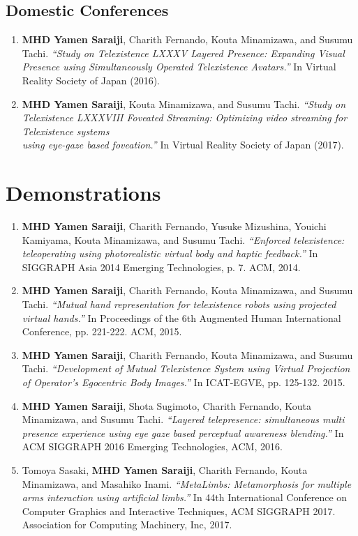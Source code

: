 \subsection{Domestic Conferences}

\begin{enumerate}
\item \textbf{MHD Yamen Saraiji}, Charith Fernando, Kouta Minamizawa, and Susumu Tachi. \textit{``Study on Telexistence LXXXV Layered Presence: Expanding Visual Presence using Simultaneously Operated Telexistence Avatars.''} In Virtual Reality Society of Japan (2016).

\item \textbf{MHD Yamen Saraiji}, Kouta Minamizawa, and Susumu Tachi. \textit{``Study on Telexistence LXXXVIII Foveated Streaming: Optimizing video streaming for Telexistence systems\\ using eye-gaze based foveation.''} In Virtual Reality Society of Japan (2017).

\end{enumerate}


\section{Demonstrations}

\begin{enumerate}
\item \textbf{MHD Yamen Saraiji}, Charith Fernando, Yusuke Mizushina, Youichi Kamiyama, Kouta Minamizawa, and Susumu Tachi. \textit{``Enforced telexistence: teleoperating using photorealistic virtual body and haptic feedback.''} In SIGGRAPH Asia 2014 Emerging Technologies, p. 7. ACM, 2014.

\item \textbf{MHD Yamen Saraiji}, Charith Fernando, Kouta Minamizawa, and Susumu Tachi. \textit{``Mutual hand representation for telexistence robots using projected virtual hands.''} In Proceedings of the 6th Augmented Human International Conference, pp. 221-222. ACM, 2015.

\item  \textbf{MHD Yamen Saraiji}, Charith Fernando, Kouta Minamizawa, and Susumu Tachi. \textit{``Development of Mutual Telexistence System using Virtual Projection of Operator's Egocentric Body Images.''} In ICAT-EGVE, pp. 125-132. 2015.

\item \textbf{MHD Yamen Saraiji}, Shota Sugimoto, Charith Fernando, Kouta Minamizawa, and Susumu Tachi. \textit{``Layered telepresence: simultaneous multi presence experience using eye gaze based perceptual awareness blending.''} In ACM SIGGRAPH 2016 Emerging Technologies, ACM, 2016.

\item Tomoya Sasaki, \textbf{MHD Yamen Saraiji}, Charith Fernando, Kouta Minamizawa, and Masahiko Inami. \textit{``MetaLimbs: Metamorphosis for multiple arms interaction using artificial limbs.''} In 44th International Conference on Computer Graphics and Interactive Techniques, ACM SIGGRAPH 2017. Association for Computing Machinery, Inc, 2017.

\end{enumerate}


